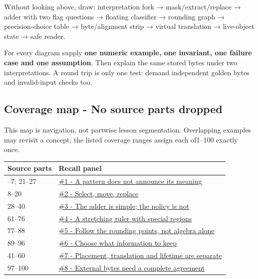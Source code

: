 Without looking above, draw: interpretation fork → mask/extract/replace → adder with two flag questions → floating classifier → rounding graph → precision-choice table → byte/alignment strip → virtual translation → live-object state → safe reader.

For every diagram supply \textbf{one numeric example, one invariant, one failure case and one assumption}. Then explain the same stored bytes under two interpretations. A round trip is only one test: demand independent golden bytes and invalid-input checks too.

\subsection{Coverage map - No source parts dropped}\label{coverage-map---no-source-parts-dropped}

This map is navigation, not partwise lesson segmentation. Overlapping examples may revisit a concept; the listed coverage ranges assign each of1--100 exactly once.

{\def\LTcaptype{none} %
\begin{longtable}[]{@{}ll@{}}
\toprule\noalign{}
Source parts & Recall panel \\
\midrule\noalign{}
\endhead
\bottomrule\noalign{}
\endlastfoot
1--7; 21--27 & \hyperref[1ux20-ux20Aux20patternux20doesux20notux20announceux20itsux20meaning]{\#1 - A pattern does not announce its meaning} \\
8--20 & \hyperref[2ux20-ux20Selectux2cux20moveux2cux20replace]{\#2 - Select, move, replace} \\
28--40 & \hyperref[3ux20-ux20Theux20adderux20isux20simple;ux20theux20policyux20isux20not]{\#3 - The adder is simple; the policy is not} \\
61--76 & \hyperref[4ux20-ux20Aux20stretchingux20rulerux20withux20specialux20regions]{\#4 - A stretching ruler with special regions} \\
77--88 & \hyperref[5ux20-ux20Followux20theux20roundingux20pointsux2cux20notux20algebraux20alone]{\#5 - Follow the rounding points, not algebra alone} \\
89--96 & \hyperref[6ux20-ux20Chooseux20whatux20informationux20toux20keep]{\#6 - Choose what information to keep} \\
41--60 & \hyperref[7ux20-ux20Placementux2cux20translationux20andux20lifetimeux20areux20separate]{\#7 - Placement, translation and lifetime are separate} \\
97--100 & \hyperref[8ux20-ux20Externalux20bytesux20needux20aux20completeux20agreement]{\#8 - External bytes need a complete agreement} \\
\end{longtable}
}

